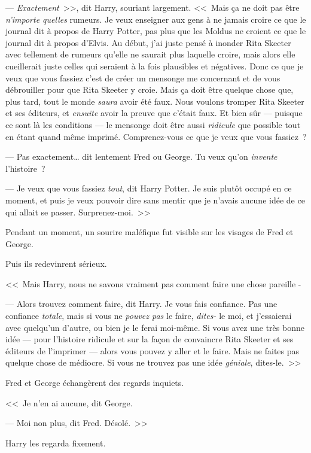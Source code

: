 --- \emph{Exactement}~>>, dit Harry, souriant largement. <<~Mais ça ne doit pas être \emph{n'importe quelles} rumeurs. Je veux enseigner aux gens à ne jamais croire ce que le journal dit à propos de Harry Potter, pas plus que les Moldus ne croient ce que le journal dit à propos d'Elvis. Au début, j'ai juste pensé à inonder Rita Skeeter avec tellement de rumeurs qu'elle ne saurait plus laquelle croire, mais alors elle cueillerait juste celles qui seraient à la fois plausibles et négatives. Donc ce que je veux que vous fassiez c'est de créer un mensonge me concernant et de vous débrouiller pour que Rita Skeeter y croie. Mais ça doit être quelque chose que, plus tard, tout le monde \emph{saura} avoir été faux. Nous voulons tromper Rita Skeeter et ses éditeurs, et \emph{ensuite} avoir la preuve que c'était faux. Et bien sûr — puisque ce sont là les conditions — le mensonge doit être aussi \emph{ridicule} que possible tout en étant quand même imprimé. Comprenez-vous ce que je veux que vous fassiez~?

--- Pas exactement… dit lentement Fred ou George. Tu veux qu'on \emph{invente} l'histoire~?

--- Je veux que vous fassiez \emph{tout}, dit Harry Potter. Je suis plutôt occupé en ce moment, et puis je veux pouvoir dire sans mentir que je n'avais aucune idée de ce qui allait se passer. Surprenez-moi.~>>

Pendant un moment, un sourire maléfique fut visible sur les visages de Fred et George.

Puis ils redevinrent sérieux.

<<~Mais Harry, nous ne savons vraiment pas comment faire une chose pareille -

--- Alors trouvez comment faire, dit Harry. Je vous fais confiance. Pas une confiance \emph{totale}, mais si vous ne \emph{pouvez pas} le faire, \emph{dites-} le moi, et j'essaierai avec quelqu'un d'autre, ou bien je le ferai moi-même. Si vous avez une très bonne idée — pour l'histoire ridicule et sur la façon de convaincre Rita Skeeter et ses éditeurs de l'imprimer — alors vous pouvez y aller et le faire. Mais ne faites pas quelque chose de médiocre. Si vous ne trouvez pas une idée \emph{géniale}, dites-le.~>>

Fred et George échangèrent des regards inquiets.

<<~Je n'en ai aucune, dit George.

--- Moi non plus, dit Fred. Désolé.~>>

Harry les regarda fixement.

